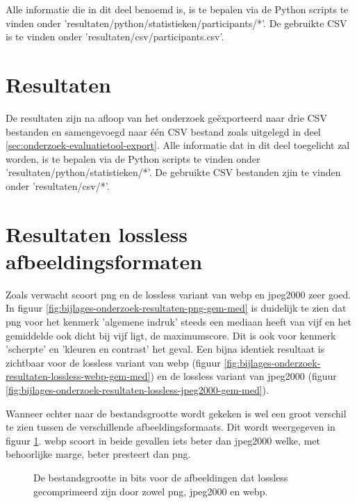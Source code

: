 Alle informatie die in dit deel benoemd is, is te bepalen via de Python scripts te vinden onder 'resultaten/python/statistieken/participants/*'. De gebruikte CSV is te vinden onder 'resultaten/csv/participants.csv'.

\section{Resultaten}
\label{sec:onderzoek-resultaten}

De resultaten zijn na afloop van het onderzoek geëxporteerd naar drie CSV bestanden en samengevoegd naar één CSV bestand zoals uitgelegd in deel \ref{sec:onderzoek-evaluatietool-export}. Alle informatie dat in dit deel toegelicht zal worden, is te bepalen via de Python scripts te vinden onder 'resultaten/python/statistieken/*'. De gebruikte CSV bestanden zjin te vinden onder 'resultaten/csv/*'.

\section{Resultaten lossless afbeeldingsformaten}
\label{sec:onderzoek-resultaten-lossles}

Zoals verwacht scoort \gls{png} en de \gls{lossless} variant van \gls{webp} en \gls{jpeg2000} zeer goed. In figuur \ref{fig:bijlages-onderzoek-resultaten-png-gem-med} is duidelijk te zien dat \gls{png} voor het kenmerk 'algemene indruk' steeds een mediaan heeft van vijf en het gemiddelde ook dicht bij vijf ligt, de maximumscore. Dit is ook voor kenmerk 'scherpte' en 'kleuren en contrast' het geval. Een bijna identiek resultaat is zichtbaar voor de \gls{lossless} variant van \gls{webp} (figuur \ref{fig:bijlages-onderzoek-resultaten-lossless-webp-gem-med}) en de \gls{lossless} variant van \gls{jpeg2000} (figuur \ref{fig:bijlages-onderzoek-resultaten-lossless-jpeg2000-gem-med}).

Wanneer echter naar de bestandsgrootte wordt gekeken is wel een groot verschil te zien tussen de verschillende \glspl{afbeeldingsformaat}. Dit wordt weergegeven in figuur \ref{fig:onderzoek-resultaten-lossless-sizes}. \Gls{webp} scoort in beide gevallen iets beter dan \gls{jpeg2000} welke, met behoorlijke marge, beter presteert dan \gls{png}.  

\begin{figure}[]
	\centering
	\caption{De bestandsgrootte in \glspl{bit} voor de afbeeldingen dat \gls{lossless} gecomprimeerd zijn door zowel \gls{png}, \gls{jpeg2000} en \gls{webp}.}
	\label{fig:onderzoek-resultaten-lossless-sizes}
\end{figure}

